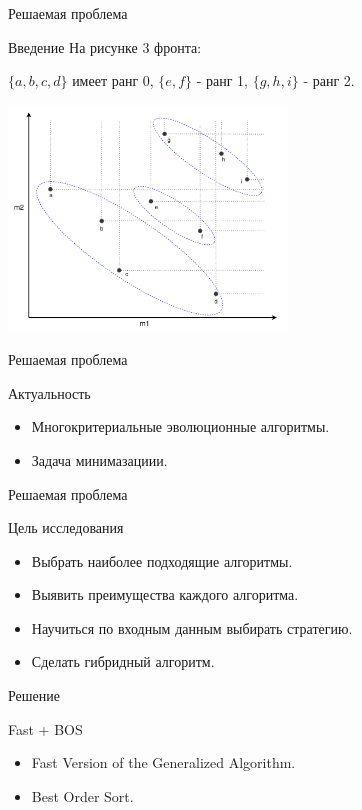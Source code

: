 \documentclass{beamer}
\begin{document}
\begin{frame}{Решаемая проблема}
\begin{block}{Введение}
На рисунке 3 фронта: 

$\{a, b, c, d\}$ имеет ранг 0, $\{e, f\}$ - ранг 1, $\{g, h, i\}$ - ранг 2.
\begin{center}
\includegraphics*[height=6cm]{pic/non_dominated_sort.png}
\end{center}
\end{block}
\end{frame}

\begin{frame}{Решаемая проблема}
\begin{block}{Актуальность}
\begin{itemize}
\item Многокритериальные эволюционные алгоритмы. 
\item Задача минимазациии.
\end{itemize}
\end{block}
\end{frame}


\begin{frame}{Решаемая проблема}
\begin{block}{Цель исследования}
\begin{itemize}
\item Выбрать наиболее подходящие алгоритмы.
\item Выявить преимущества каждого алгоритма.
\item Научиться по входным данным выбирать стратегию.
\item Сделать гибридный алгоритм.
\end{itemize}
\end{block}
\end{frame}


\begin{frame}{Решение}
\begin{block}{Fast + BOS}
\begin{center}
\end{center}
\begin{itemize}
\item Fast Version of the Generalized Algorithm.
\item Best Order Sort.
\end{itemize}
\end{block}
\end{frame}
\end{document}
